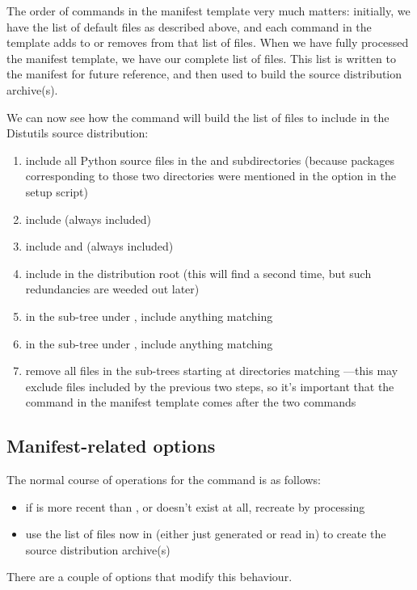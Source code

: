 \documentclass{howto}
\begin{document}
The order of commands in the manifest template very much matters:
initially, we have the list of default files as described above, and
each command in the template adds to or removes from that list of files.
When we have fully processed the manifest template, we have our complete
list of files.  This list is written to the manifest for future
reference, and then used to build the source distribution archive(s).

We can now see how the  command will build the list of
files to include in the Distutils source distribution:
\begin{enumerate}
\item include all Python source files in the  and
   subdirectories (because packages
  corresponding to those two directories were mentioned in the
   option in the setup script)
\item include  (always included)
\item include  and  (always included)
\item include  in the distribution root (this will find
   a second time, but such redundancies are weeded out
  later)
\item in the sub-tree under , include anything matching
\item in the sub-tree under , include anything matching
\item remove all files in the sub-trees starting at directories matching
  ---this may exclude files included by the
  previous two steps, so it's important that the  command in
  the manifest template comes after the two 
  commands
\end{enumerate}


\subsection{Manifest-related options}
\label{sec:manifest-options}

The normal course of operations for the  command is as
follows:
\begin{itemize}
\item if  is more recent than , or
   doesn't exist at all, recreate  by
  processing 
\item use the list of files now in  (either just
  generated or read in) to create the source distribution archive(s)
\end{itemize}
There are a couple of options that modify this behaviour.
\end{document}
